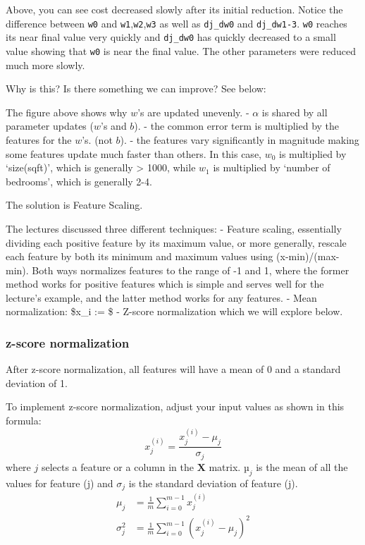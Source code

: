 \documentclass[11pt]{article}
\begin{document}
Above, you can see cost decreased slowly after its initial reduction.
Notice the difference between \texttt{w0} and
\texttt{w1},\texttt{w2},\texttt{w3} as well as \texttt{dj\_dw0} and
\texttt{dj\_dw1-3}. \texttt{w0} reaches its near final value very
quickly and \texttt{dj\_dw0} has quickly decreased to a small value
showing that \texttt{w0} is near the final value. The other parameters
were reduced much more slowly.

Why is this? Is there something we can improve? See below:

The figure above shows why \(w\)'s are updated unevenly. - \(\alpha\) is
shared by all parameter updates (\(w\)'s and \(b\)). - the common error
term is multiplied by the features for the \(w\)'s. (not \(b\)). - the
features vary significantly in magnitude making some features update
much faster than others. In this case, \(w_0\) is multiplied by
`size(sqft)', which is generally \textgreater{} 1000, while \(w_1\) is
multiplied by `number of bedrooms', which is generally 2-4.

The solution is Feature Scaling.

    The lectures discussed three different techniques: - Feature scaling,
essentially dividing each positive feature by its maximum value, or more
generally, rescale each feature by both its minimum and maximum values
using (x-min)/(max-min). Both ways normalizes features to the range of
-1 and 1, where the former method works for positive features which is
simple and serves well for the lecture's example, and the latter method
works for any features. - Mean normalization: \$x\_i :=
 \$ - Z-score normalization which we will
explore below.

    \hypertarget{z-score-normalization}{%
\subsubsection{z-score normalization}\label{z-score-normalization}}

After z-score normalization, all features will have a mean of 0 and a
standard deviation of 1.

To implement z-score normalization, adjust your input values as shown in
this formula:
\[x^{(i)}_j = \dfrac{x^{(i)}_j - \mu_j}{\sigma_j} \tag{4}\] where \(j\)
selects a feature or a column in the \(\mathbf{X}\) matrix. \(µ_j\) is
the mean of all the values for feature (j) and \(\sigma_j\) is the
standard deviation of feature (j). \[
\begin{align}
\mu_j &= \frac{1}{m} \sum_{i=0}^{m-1} x^{(i)}_j \tag{5}\\
\sigma^2_j &= \frac{1}{m} \sum_{i=0}^{m-1} (x^{(i)}_j - \mu_j)^2  \tag{6}
\end{align}
\]
\end{document}
